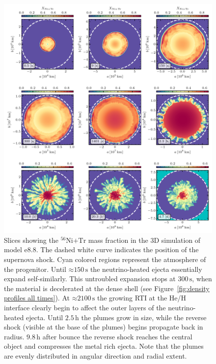 \documentclass[fleqn,usenatbib]{mnras}
\newcommand{\nickel}{\ensuremath{\mathrm{^{56}Ni}}\xspace}
\newcommand{\tracer}{\ensuremath{\mathrm{Tr}}\xspace}
\newcommand{\s}{\ensuremath{\text{s}}}
\newcommand{\onemg}{\ensuremath{\mathrm{e8.8}}\xspace}
\begin{document}
\begin{figure}%
 \centering
 \includegraphics[width=\textwidth,trim=0.2cm 0cm 0cm 0cm,clip]{pic/e8_3d_3x3_NiX.pdf} 
 \caption{Slices
    showing the $\nickel\mathord{+}\tracer$ mass fraction in the 3D simulation of model \onemg. The dashed white curve indicates 
    the position of the supernova shock. Cyan colored regions represent the atmosphere of the progenitor. Until $\mathord{\approx}150\,\s$ the neutrino-heated 
    ejecta essentially expand self-similarly. This untroubled expansion stops at
    $300\,\s$, when the material is decelerated at the dense shell 
    (see Figure~\ref{fig:density profiles all times}). At $\mathord{\approx}2100\,\s$
    the growing RTI at the He/H interface clearly begin to affect the outer 
    layers of the neutrino-heated ejecta. Until $2.5\,\text{h}$ the plumes 
    grow in size, while the reverse shock (visible at the base of the plumes)
    begins propagate back in radius. $9.8\,\text{h}$ after bounce the reverse
    shock reaches the central object and compresses the metal
    rich ejecta. Note that the plumes are evenly distributed in angular direction and radial extent. }
 \label{fig:e8 nix cuts}
\end{figure}
\end{document}
